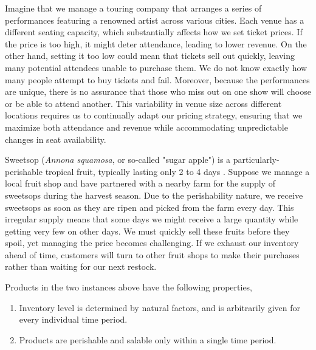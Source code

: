 \begin{example}\label{example_performance}
    Imagine that we manage a touring company that arranges a series of performances featuring a renowned artist across various cities. Each venue has a different seating capacity, which substantially affects how we set ticket prices. If the price is too high, it might deter attendance, leading to lower revenue. On the other hand, setting it too low could mean that tickets sell out quickly, leaving many potential attendees unable to purchase them. We do not know exactly how many people attempt to buy tickets and fail. Moreover, because the performances are unique, there is no assurance that those who miss out on one show will choose or be able to attend another. This variability in venue size across different locations requires us to continually adapt our pricing strategy, ensuring that we maximize both attendance and revenue while accommodating unpredictable changes in seat availability.
\end{example}
\vspace{1em}
\begin{example}\label{example_fruit}
    Sweetsop (\emph{Annona squamosa}, or so-called "sugar apple") is a  particularly-perishable tropical fruit, typically lasting only 2 to 4 days \citep{crane2005sugar}. Suppose we manage a local fruit shop and have partnered with a nearby farm for the supply of sweetsops during the harvest season. Due to the perishability nature, we receive sweetsops as soon as they are ripen and picked from the farm every day. This irregular supply means that some days we might receive a large quantity while getting very few on other days. We must quickly sell these fruits before they spoil, yet managing the price becomes challenging. If we exhaust our inventory ahead of time, customers will turn to other fruit shops to make their purchases rather than waiting for our next restock.  %
\end{example}
Products in the two instances above have the following properties,
\begin{enumerate}
    \item Inventory level is determined by natural factors, and is arbitrarily given for every individual time period.
    \item Products are perishable and salable only within a single time period.
\end{enumerate}

